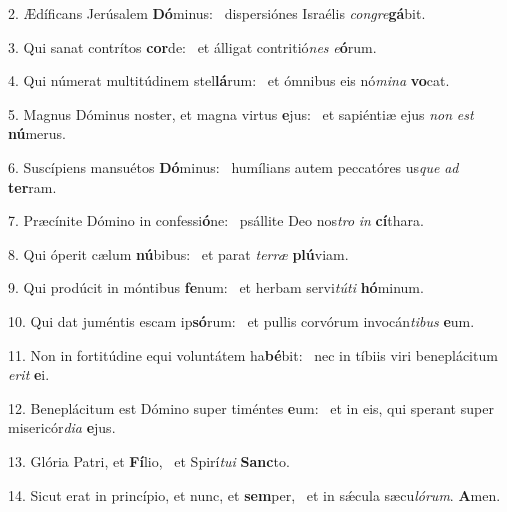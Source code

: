 2. Ædíficans Jerúsalem \textbf{Dó}minus: \ast\  dispersiónes Israélis \textit{con}\textit{gre}\textbf{gá}bit.\

3. Qui sanat contrítos \textbf{cor}de: \ast\  et álligat contritió\textit{nes} \textit{e}\textbf{ó}rum.\

4. Qui númerat multitúdinem stel\textbf{lá}rum: \ast\  et ómnibus eis nó\textit{mi}\textit{na} \textbf{vo}cat.\

5. Magnus Dóminus noster, et magna virtus \textbf{e}jus: \ast\  et sapiéntiæ ejus \textit{non} \textit{est} \textbf{nú}merus.\

6. Suscípiens mansuétos \textbf{Dó}minus: \ast\  humílians autem peccatóres us\textit{que} \textit{ad} \textbf{ter}ram.\

7. Præcínite Dómino in confessi\textbf{ó}ne: \ast\  psállite Deo nos\textit{tro} \textit{in} \textbf{cí}thara.\

8. Qui óperit cælum \textbf{nú}bibus: \ast\  et parat \textit{ter}\textit{ræ} \textbf{plú}viam.\

9. Qui prodúcit in móntibus \textbf{fe}num: \ast\  et herbam servi\textit{tú}\textit{ti} \textbf{hó}minum.\

10. Qui dat juméntis escam ip\textbf{só}rum: \ast\  et pullis corvórum invocán\textit{ti}\textit{bus} \textbf{e}um.\

11. Non in fortitúdine equi voluntátem ha\textbf{bé}bit: \ast\  nec in tíbiis viri beneplácitum \textit{e}\textit{rit} \textbf{e}i.\

12. Beneplácitum est Dómino super timéntes \textbf{e}um: \ast\  et in eis, qui sperant super misericór\textit{di}\textit{a} \textbf{e}jus.\

13. Glória Patri, et \textbf{Fí}lio, \ast\  et Spirí\textit{tu}\textit{i} \textbf{Sanc}to.\

14. Sicut erat in princípio, et nunc, et \textbf{sem}per, \ast\  et in sǽcula sæcu\textit{ló}\textit{rum}. \textbf{A}men.\

